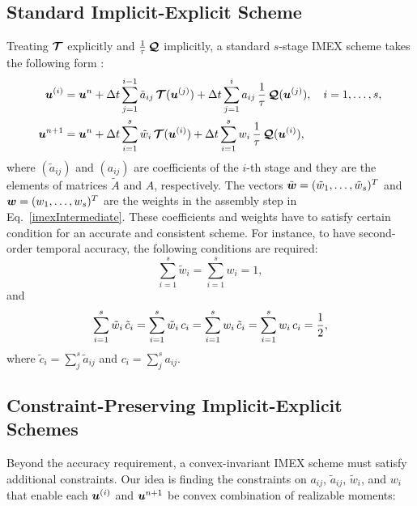 \subsection{Standard Implicit-Explicit Scheme}
Treating $\boldsymbol{\mathcal{T}}$ explicitly and $\frac{1}{\tau}\,\boldsymbol{\mathcal{Q}}$ implicitly, a standard $s$-stage IMEX scheme takes the following form \cite{pareschiRusso_2005}: 
\begin{align}
  \boldsymbol{u}^{(i)}
  &=\boldsymbol{u}^{n}
  +\Delta t\sum_{j=1}^{i-1}\tilde{a}_{ij}\,\boldsymbol{\mathcal{T}}(\boldsymbol{u}^{(j)})
  +\Delta t\sum_{j=1}^{i}a_{ij}\,\frac{1}{\tau}\,\boldsymbol{\mathcal{Q}}(\boldsymbol{u}^{(j)}),
  \quad i=1,\ldots,s, \label{imexStages} \\
  \boldsymbol{u}^{n+1}
  &=\boldsymbol{u}^{n}
  +\Delta t\sum_{i=1}^{s}\tilde{w}_{i}\,\boldsymbol{\mathcal{T}}(\boldsymbol{u}^{(i)})
  +\Delta t\sum_{i=1}^{s}w_{i}\,\frac{1}{\tau}\,\boldsymbol{\mathcal{Q}}(\boldsymbol{u}^{(i)}), \label{imexIntermediate} 
\end{align}
where  $(\tilde{a}_{ij})$ and $(a_{ij})$ are coefficients of the $i$-th stage and they are the elements of matrices $\tilde{A}$ and $A$, respectively.
The vectors $\tilde{\boldsymbol{w}}=(\tilde{w}_{1},\ldots,\tilde{w}_{s})^{T}$ and $\boldsymbol{w}=(w_{1},\ldots,w_{s})^{T}$ are the weights in the assembly step in Eq.~\eqref{imexIntermediate}.
These coefficients and weights have to satisfy certain condition for an accurate and consistent scheme.
For instance, to have second-order temporal accuracy, the following conditions are required:
\begin{equation}
  \sum_{i=1}^{s}\tilde{w}_{i}=\sum_{i=1}^{s}w_{i}=1,
  \label{orderConditions1}
\end{equation}
and
\begin{equation}
  \sum_{i=1}^{s}\tilde{w}_{i}\,\tilde{c}_{i}
  =\sum_{i=1}^{s}\tilde{w}_{i}\,c_{i}
  =\sum_{i=1}^{s}w_{i}\,\tilde{c}_{i}
  =\sum_{i=1}^{s}w_{i}\,c_{i}=\frac{1}{2}, 
  \label{orderConditions2}
\end{equation}
where $\tilde{c}_{i} = \sum_{j}^{s}\tilde{a}_{ij}$ and $c_{i}=\sum_{j}^{s}a_{ij}$.

\subsection{Constraint-Preserving Implicit-Explicit Schemes}
Beyond the accuracy requirement, a convex-invariant IMEX scheme must satisfy additional constraints.
Our idea is finding the constraints on $a_{ij}$, $\tilde{a}_{ij}$, $\tilde{w}_{i}$, and $w_{i}$ that enable each $\boldsymbol{u}^{(i)}$ and $\boldsymbol{u}^{n+1}$ be convex combination of realizable moments:

